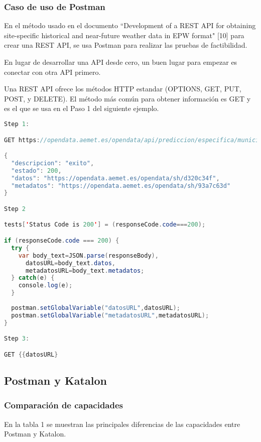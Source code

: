 \documentclass[twoside,twocolumn]{article}
\begin{document}
\subsubsection{Caso de uso de Postman}

En el método usado en el documento ``Development of a REST API for obtaining site-specific historical and near-future weather data in EPW format" [10] para crear una REST API, se usa Postman para realizar las pruebas de factibilidad.

En lugar de desarrollar una API desde cero, un buen lugar para empezar es conectar con otra API primero.

Una REST API ofrece los métodos HTTP estandar (OPTIONS, GET, PUT, POST, y DELETE). El método más común para obtener información es GET y es el que se usa en el Paso 1 del siguiente ejemplo.

\begin{lstlisting}[language=java]
Step 1:

GET https://opendata.aemet.es/opendata/api/prediccion/especifica/municipio/horaria/31201/?api_key={{AEMET_api_key}code}

{
  "descripcion": "exito",
  "estado": 200,
  "datos": "https://opendata.aemet.es/opendata/sh/d320c34f",
  "metadatos": "https://opendata.aemet.es/opendata/sh/93a7c63d"
}

Step 2

tests['Status Code is 200'] = (responseCode.code===200);

if (responseCode.code === 200) {
  try {
    var body_text=JSON.parse(responseBody),
      datosURL=body_text.datos,
      metadatosURL=body_text.metadatos;
  } catch(e) {
    console.log(e);
  }
  
  postman.setGlobalVariable("datosURL",datosURL);
  postman.setGlobalVariable("metadatosURL",metadatosURL);
}

Step 3:

GET {{datosURL}
\end{lstlisting}

\subsection{Postman y Katalon}

\subsubsection{Comparación de capacidades}

En la tabla 1 se muestran las principales diferencias de las capacidades entre Postman y Katalon.
\end{document}

